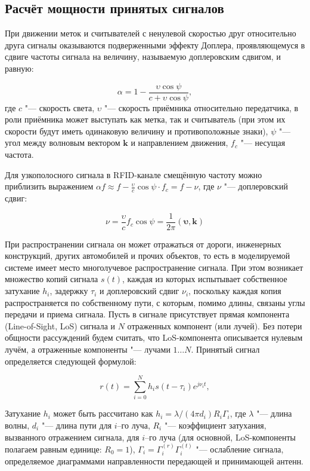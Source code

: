 \subsection{Расчёт мощности принятых сигналов}

При движении меток и считывателей с ненулевой скоростью друг относительно друга сигналы оказываются подверженными эффекту Доплера, проявляющемуся в сдвиге частоты сигнала на величину, называемую доплеровским сдвигом, и равную:

$$
	\alpha = 1 - \frac{\upsilon \cos{\psi}}{c+\upsilon \cos{\psi}},
$$
где $c$ "--- скорость света, $\upsilon$ "--- скорость приёмника относительно передатчика, в роли приёмника может выступать как метка, так и считыватель (при этом их скорости будут иметь одинаковую величину и противоположные знаки), $\psi$ "--- угол между волновым вектором $\bm{k}$ и направлением движения, $f_c$ "--- несущая частота. 

Для узкополосного сигнала в RFID-канале смещённую частоту можно приблизить выражением $\alpha f \approx f - \frac{\upsilon}{c}\cos{\psi} \cdot f_c = f - \nu$, где $\nu$ "--- доплеровский сдвиг:

$$
	\nu = \frac{\upsilon}{c} f_c\cos{\psi} = \frac{1}{2\pi}(\bm{\upsilon},\bm{k})
$$

При распространении сигнала он может отражаться от дороги, инженерных конструкций, других автомобилей и прочих объектов, то есть в моделируемой системе имеет место многолучевое распространение сигнала. При этом возникает множество копий сигнала $s(t)$, каждая из которых испытывает собственное затухание $h_i$, задержку $\tau_i$ и доплеровский сдвиг $\nu_i$, поскольку каждая копия распространяется по собственному пути, с которым, помимо длины, связаны углы передачи и приема сигнала. Пусть в сигнале присутствует прямая компонента (Line-of-Sight, LoS) сигнала и $N$ отраженных компонент (или лучей). Без потери общности рассуждений будем считать, что LoS-компонента описывается нулевым лучём, а отраженные компоненты "--- лучами $1 \dots N$. Принятый сигнал определяется следующей формулой:

\begin{equation}
	r(t) = \sum\limits_{i=0}^{N} h_i s(t-\tau_i) e^{j\nu_i t},
	\label{eq:ch2_rx_signal}
\end{equation}

Затухание $h_i$ может быть рассчитано как $h_i=\lambda/(4\pi d_i)R_i\Gamma_i$, где $\lambda$ "--- длина волны, $d_i$ "--- длина пути для $i$--го луча, $R_i$ "--- коэффициент затухания, вызванного отражением сигнала, для $i$--го луча (для основной, LoS-компоненты полагаем равным единице: $R_0=1$), $\Gamma_i = \Gamma_i^{(r)}\Gamma_i^{(t)}$ "--- ослабление сигнала, определяемое диаграммами направленности передающей и принимающей антенн.

